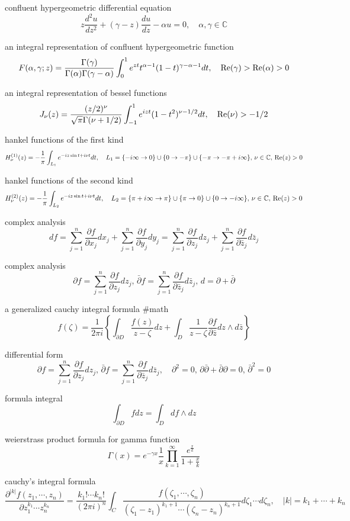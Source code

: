 confluent hypergeometric differential equation
$$
z\frac{d^2 u}{dz^2}+(\gamma-z)\frac{d u}{dz}-\alpha u=0, \quad \alpha,\gamma \in {\mathbb C}
$$

an integral representation of confluent hypergeometric function
$$
F(\alpha,\gamma;z)=\frac{\Gamma(\gamma)}{\Gamma(\alpha)\Gamma(\gamma-\alpha)}\int^1_0 e^{zt}t^{\alpha-1}(1-t)^{\gamma-\alpha-1}dt, \quad {\rm Re}(\gamma)>{\rm Re}(\alpha)>0
$$

an integral representation of bessel functions
$$
J_\nu(z)=\frac{(z/2)^\nu}{\sqrt{\pi}\Gamma(\nu+1/2)}\int^1_{-1}e^{izt}(1-t^2)^{\nu-1/2}dt, \quad {\rm Re}(\nu)>-1/2
$$

hankel functions of the first kind
$$
H^{(1)}_\nu(z)=-\frac{1}{\pi}\int_{L_1}e^{-iz\sin t+i\nu t}dt,\quad L_1=\{-i\infty \rightarrow 0\}\cup \{0 \rightarrow -\pi\}\cup\{-\pi \rightarrow -\pi+i\infty\}, \, \nu \in {\mathbb C},\, {\rm Re}(z)>0
$$

hankel functions of the second kind
$$
H^{(2)}_\nu(z)=-\frac{1}{\pi}\int_{L_2}e^{-iz\sin t+i\nu t}dt,\quad L_2=\{\pi+i\infty \rightarrow \pi\}\cup \{\pi \rightarrow 0\}\cup\{0  \rightarrow -i\infty\}, \, \nu \in {\mathbb C},\, {\rm Re}(z)>0
$$

complex analysis
$$
df=\sum^n_{j=1}\frac{\partial f}{\partial x_j}dx_j+\sum^n_{j=1}\frac{\partial f}{\partial y_j}dy_j=\sum^n_{j=1}\frac{\partial f}{\partial z_j}dz_j+\sum^n_{j=1}\frac{\partial f}{\partial \bar{z}_j}d\bar{z}_j
$$

complex analysis
$$
\partial f=\sum^n_{j=1}\frac{\partial f}{\partial z_j}dz_j, \, \bar{\partial} f=\sum^n_{j=1}\frac{\partial f}{\partial \bar{z}_j}d\bar{z}_j, \, d=\partial+\bar{\partial}
$$

a generalized cauchy integral formula #math
$$
f(\zeta)=\frac{1}{2\pi i}\left\{\int_{\partial D}\frac{f(z)}{z-\zeta}dz+\int_D\frac{1}{z-\zeta}\frac{\partial f}{\partial \bar{z}}dz\wedge d\bar{z}\right\}
$$

differential form
$$
\partial f=\sum^n_{j=1}\frac{\partial f}{\partial z_j}dz_j, \, \bar{\partial} f=\sum^n_{j=1}\frac{\partial f}{\partial \bar{z}_j}d\bar{z}_j, \quad \partial^2=0, \,\partial\bar{\partial}+\bar{\partial}\partial=0, \,  \bar{\partial}^2=0
$$

formula integral
$$
\int_{\partial D}f dz=\int_D df \wedge dz
$$

weierstrass product formula for gamma function
$$
\Gamma(x)=e^{-\gamma x}\frac{1}{x}\prod^\infty_{k=1}\frac{e^{\frac{x}{k}}}{1+\frac{x}{k}}
$$

cauchy’s integral formula
$$
\frac{\partial^{|k|}f(z_1,\cdots,z_n)}{\partial z_1^{k_1} \cdots z_n^{k_n}}=\frac{k_1!\cdots k_n!}{(2\pi i)^n}\int_C \frac{f(\zeta_1,\cdots,\zeta_n)}{(\zeta_1-z_1)^{k_1+1}\cdots(\zeta_n-z_n)^{k_n+1}}d\zeta_1\cdots d\zeta_n, \quad |k|=k_1+\cdots +k_n
$$

